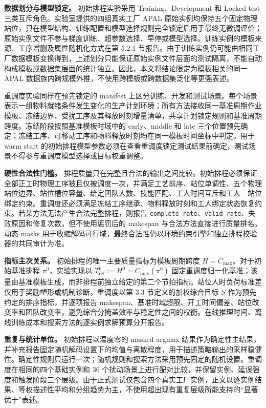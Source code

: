 \documentclass[journal,10pt]{IEEEtran}
\begin{document}
\textbf{数据划分与模型锁定。} 初始排程实验采用 Training、Development 和 Locked test 三类互斥角色。实验室提供的四组真实工厂 APAL 原始实例均保持五个固定物理站位，只在模型结构、训练配置和模型选择规则完全锁定后用于最终无微调评价；原始实例文件不参与梯度训练、超参数选择、早停或模型选择。训练实例的模板来源、工序增删及属性随机化方式在第 5.2.1 节报告。由于训练实例仍可能由相同工厂数据模板变换得到，上述划分只能保证原始实例文件层面的测试隔离，不能自动构成模板或数据集层面的统计独立。因此，本文将结论限定为模板相关的同一 APAL 数据族内跨规模外推，不使用跨模板或跨数据集泛化等更强表述。

重调度实验同样在预先锁定的 manifest 上区分训练、开发和测试场景。每个场景表示一组物料就绪条件发生变化的生产计划环境；所有方法接收同一基准周期作业模板、冻结边界、受扰工序及其释放时刻增量清单，共享计划锁定规则和基准周期跨度。冻结阶段按照基准模板时域中的 early、middle 和 late 三个位置预先确定；冻结工序、可移动工序和物料释放时刻均在同一模板时间坐标中判定。用于 warm start 的初始排程模型参数必须在查看重调度锁定测试结果前确定，测试场景不得参与重调度模型选择或目标权重调整。

\textbf{硬性合法性门槛。} 排程质量只在完整且合法的输出之间比较。初始排程必须保证全部正工时物理工序被且仅被调度一次，并满足工艺前序、站位单调性、五个物理站位边界、站位槽位容量、给定团队人数、技能匹配、工人时间互斥和工人---站位绑定约束。重调度还必须满足冻结工序继承、物料释放时刻和工人绑定状态恢复约束。若某方法无法产生合法完整排程，则报告 \texttt{complete\ rate}、\texttt{valid\ rate}、失败原因和修复次数，但不使用惩罚后的 makespan 与合法方法直接进行质量排名。动态 masks 用于收缩解码可行域，最终合法性仍以环境约束引擎和独立排程校验器的共同审计为准。

\textbf{指标主次关系。} 初始排程的唯一主要质量指标为模板周期跨度 \(H=C_{\max}\)。对于初始基准排程 \(\pi^0\)，实验实现以 \(T_{\mathrm{ref}}^0:=H^0=C_{\max}(\pi^0)\) 固定重调度归一化基准；该量由基准模板生成，而非排程前独立给定的第二个节拍指标。站位人时负荷标准差仅用于奖励塑形或机制诊断。重调度以第 3.3 节定义的加权综合目标 \(S\) 作为预先约定的排序指标，并逐项报告 makespan、基准时域超限、开工时间偏差、站位改变率和团队改变率，避免综合分掩盖效率与稳定性之间的权衡。在线推理时间、离线训练成本和搜索方法的逐实例求解预算分开报告。

\textbf{重复与统计单位。} 初始排程以温度零的 masked argmax 结果作为确定性主结果，并补充报告固定随机解码设置下的均值与离散程度，用于描述策略输出的采样稳健性。确定性规则只运行一次；随机规则和搜索方法采用预先固定的随机设置。重调度在相同的四个基础实例和 36 个扰动场景上进行配对比较，并保留实例、延误强度和触发阶段三个层级。由于正式测试仅包含四个真实工厂实例，正文以逐实例结果、等权描述性平均和分组趋势为主，不使用超出现有重复层级所能支持的``显著优于''表述。
\end{document}
